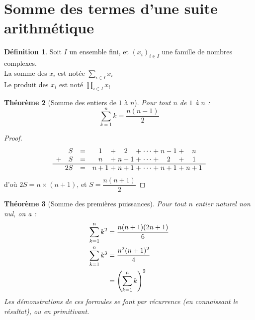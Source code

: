 \documentclass[11pt,a4paper]{report}
\newtheorem{theorem}{Théorème}[chapter]
\theoremstyle{definition}
\newtheorem{dfn}[theorem]{Définition}
\begin{document}
\section{Somme des termes d'une suite arithmétique} %
\label{sec:sommes_arithmetiques}
\begin{dfn}
     Soit $I$ un ensemble fini, et $(x_i)_{i\in I}$ une famille de nombres complexes. \\[\baselineskip]
     La somme des $x_i$ est notée $\sum_{i\in I} x_i$\\
     Le produit des $x_i$ est noté $\prod_{i\in I} x_i$
\end{dfn}
\begin{theorem}[Somme des entiers de $1$ à $n$]
     Pour tout $n$ de $1$ à $n$ : 
     \begin{equation}
     \sum_{k=1}^n k = \dfrac{n(n-1)}{2}
     \end{equation}
\end{theorem}
\begin{proof}
\begin{equation}
     \begin{array}{r c *{4}{c@{\; + \;}} c}
          S & = & 1 & 2 & \cdots & n-1 & n \\
          +\quad S & = & n & n-1 & \cdots & 2 & 1 \\
          \hline
          2S & = & n+1 & n+1 & \cdots & n+1 & n+1
     \end{array}
\end{equation}
d'où $2S = n \times (n+1)$, et $S=\dfrac{n(n+1)}{2}$
\end{proof}
\begin{theorem}[Somme des premières puissances]
    Pour tout $n$ entier naturel non nul, on a : 
    \begin{subequations}
         \begin{align}
              \sum_{k=1}^n k^2 &= \dfrac{n(n+1)(2n+1)}{6} \\
              \sum_{k=1}^n k^3 &= \dfrac{n^2(n+1)^2}{4} \\
               &= \left( \sum_{k=1}^n k \right)^2 \notag
         \end{align}
    \end{subequations}
    Les démonstrations de ces formules se font par récurrence (en connaissant le résultat), ou en primitivant.
\end{theorem}
\end{document}
